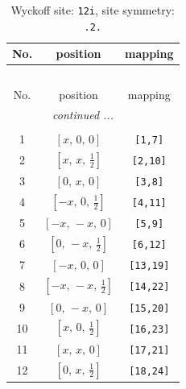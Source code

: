 \documentclass[fleqn,8pt]{jsarticle}
\begin{document}
\renewcommand{\arraystretch}{1.2}
\begin{longtable}{ccc}
\caption{Wyckoff site: {\tt 12i}, site symmetry: {\tt .2.}}
 \\
 \hline \hline
No. & position & mapping \\ \hline \endfirsthead

\multicolumn{2}{l}{\tablename\ \thetable{}} \\
 \hline \hline
No. & position & mapping \\ \hline \endhead

 \hline \hline
\multicolumn{2}{r}{\footnotesize\it continued ...} \\ \endfoot

 \hline \hline
\multicolumn{2}{r}{} \\ \endlastfoot

1 & $\left[ x,\, 0,\, 0 \right]$ & {\tt [1,7]} \\ \hline
2 & $\left[ x,\, x,\, \frac{1}{2} \right]$ & {\tt [2,10]} \\ \hline
3 & $\left[ 0,\, x,\, 0 \right]$ & {\tt [3,8]} \\ \hline
4 & $\left[ - x,\, 0,\, \frac{1}{2} \right]$ & {\tt [4,11]} \\ \hline
5 & $\left[ - x,\, - x,\, 0 \right]$ & {\tt [5,9]} \\ \hline
6 & $\left[ 0,\, - x,\, \frac{1}{2} \right]$ & {\tt [6,12]} \\ \hline
7 & $\left[ - x,\, 0,\, 0 \right]$ & {\tt [13,19]} \\ \hline
8 & $\left[ - x,\, - x,\, \frac{1}{2} \right]$ & {\tt [14,22]} \\ \hline
9 & $\left[ 0,\, - x,\, 0 \right]$ & {\tt [15,20]} \\ \hline
10 & $\left[ x,\, 0,\, \frac{1}{2} \right]$ & {\tt [16,23]} \\ \hline
11 & $\left[ x,\, x,\, 0 \right]$ & {\tt [17,21]} \\ \hline
12 & $\left[ 0,\, x,\, \frac{1}{2} \right]$ & {\tt [18,24]} \\
\end{longtable}
\renewcommand{\arraystretch}{1.2}
\end{document}
